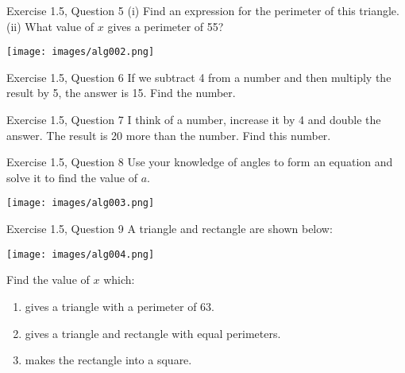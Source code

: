 \documentclass[leqno,usenames,dvipsnames,14pt]{beamer}
\begin{document}
\begin{frame}{Exercise 1.5, Question 5}
\Large
  (i) Find an expression for the perimeter of this triangle.\\
  (ii) What value of \( x \) gives a perimeter of 55?

  \begin{center}
    \texttt{[image: images/alg002.png]}
  \end{center}
\end{frame}

\begin{frame}{Exercise 1.5, Question 6}
\Large
  If we subtract 4 from a number and then multiply the result by 5, the answer is 15. Find the number.
\end{frame}

\begin{frame}{Exercise 1.5, Question 7}
\Large
  I think of a number, increase it by 4 and double the answer. The result is 20 more than the number. Find this number.
\end{frame}

\begin{frame}{Exercise 1.5, Question 8}
\Large
  Use your knowledge of angles to form an equation and solve it to find the value of \( a \).

  \begin{center}
    \texttt{[image: images/alg003.png]}
  \end{center}
\end{frame}

\begin{frame}{Exercise 1.5, Question 9}
\Large
  A triangle and rectangle are shown below:

  \begin{center}
    \texttt{[image: images/alg004.png]}
  \end{center}
  
  Find the value of \( x \) which:
  \begin{enumerate}
    \item gives a triangle with a perimeter of 63.
    \item gives a triangle and rectangle with equal perimeters.
    \item makes the rectangle into a square.
  \end{enumerate}
\end{frame}
\end{document}
